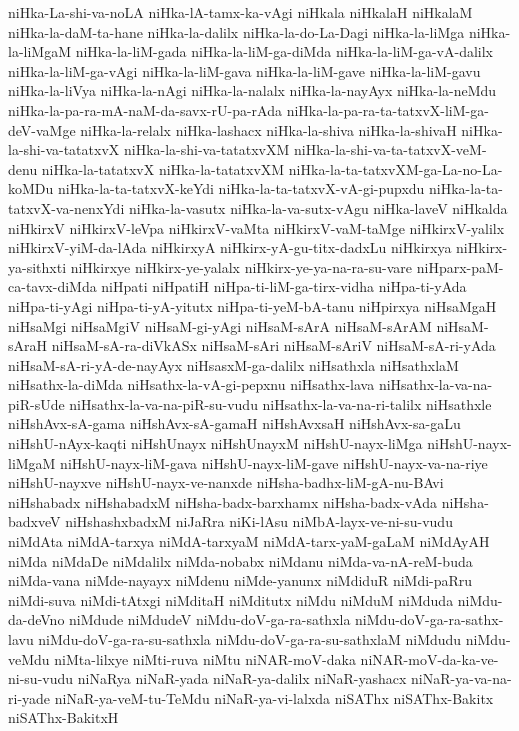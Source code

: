 {niHka-La-shi-va-noLA
niHka-lA-tamx-ka-vAgi
niHkala
niHkalaH
niHkalaM
niHka-la-daM-ta-hane
niHka-la-dalilx
niHka-la-do-La-Dagi
niHka-la-liMga
niHka-la-liMgaM
niHka-la-liM-gada
niHka-la-liM-ga-diMda
niHka-la-liM-ga-vA-dalilx
niHka-la-liM-ga-vAgi
niHka-la-liM-gava
niHka-la-liM-gave
niHka-la-liM-gavu
niHka-la-liVya
niHka-la-nAgi
niHka-la-nalalx
niHka-la-nayAyx
niHka-la-neMdu
niHka-la-pa-ra-mA-naM-da-savx-rU-pa-rAda
niHka-la-pa-ra-ta-tatxvX-liM-ga-deV-vaMge
niHka-la-relalx
niHka-lashacx
niHka-la-shiva
niHka-la-shivaH
niHka-la-shi-va-tatatxvX
niHka-la-shi-va-tatatxvXM
niHka-la-shi-va-ta-tatxvX-veM-denu
niHka-la-tatatxvX
niHka-la-tatatxvXM
niHka-la-ta-tatxvXM-ga-La-no-La-koMDu
niHka-la-ta-tatxvX-keYdi
niHka-la-ta-tatxvX-vA-gi-pupxdu
niHka-la-ta-tatxvX-va-nenxYdi
niHka-la-vasutx
niHka-la-va-sutx-vAgu
niHka-laveV
niHkalda
niHkirxV
niHkirxV-leVpa
niHkirxV-vaMta
niHkirxV-vaM-taMge
niHkirxV-yalilx
niHkirxV-yiM-da-lAda
niHkirxyA
niHkirx-yA-gu-titx-dadxLu
niHkirxya
niHkirx-ya-sithxti
niHkirxye
niHkirx-ye-yalalx
niHkirx-ye-ya-na-ra-su-vare
niHparx-paM-ca-tavx-diMda
niHpati
niHpatiH
niHpa-ti-liM-ga-tirx-vidha
niHpa-ti-yAda
niHpa-ti-yAgi
niHpa-ti-yA-yitutx
niHpa-ti-yeM-bA-tanu
niHpirxya
niHsaMgaH
niHsaMgi
niHsaMgiV
niHsaM-gi-yAgi
niHsaM-sArA
niHsaM-sArAM
niHsaM-sAraH
niHsaM-sA-ra-diVkASx
niHsaM-sAri
niHsaM-sAriV
niHsaM-sA-ri-yAda
niHsaM-sA-ri-yA-de-nayAyx
niHsasxM-ga-dalilx
niHsathxla
niHsathxlaM
niHsathx-la-diMda
niHsathx-la-vA-gi-pepxnu
niHsathx-lava
niHsathx-la-va-na-piR-sUde
niHsathx-la-va-na-piR-su-vudu
niHsathx-la-va-na-ri-talilx
niHsathxle
niHshAvx-sA-gama
niHshAvx-sA-gamaH
niHshAvxsaH
niHshAvx-sa-gaLu
niHshU-nAyx-kaqti
niHshUnayx
niHshUnayxM
niHshU-nayx-liMga
niHshU-nayx-liMgaM
niHshU-nayx-liM-gava
niHshU-nayx-liM-gave
niHshU-nayx-va-na-riye
niHshU-nayxve
niHshU-nayx-ve-nanxde
niHsha-badhx-liM-gA-nu-BAvi
niHshabadx
niHshabadxM
niHsha-badx-barxhamx
niHsha-badx-vAda
niHsha-badxveV
niHshashxbadxM
niJaRra
niKi-lAsu
niMbA-layx-ve-ni-su-vudu
niMdAta
niMdA-tarxya
niMdA-tarxyaM
niMdA-tarx-yaM-gaLaM
niMdAyAH
niMda
niMdaDe
niMdalilx
niMda-nobabx
niMdanu
niMda-va-nA-reM-buda
niMda-vana
niMde-nayayx
niMdenu
niMde-yanunx
niMdiduR
niMdi-paRru
niMdi-suva
niMdi-tAtxgi
niMditaH
niMditutx
niMdu
niMduM
niMduda
niMdu-da-deVno
niMdude
niMdudeV
niMdu-doV-ga-ra-sathxla
niMdu-doV-ga-ra-sathx-lavu
niMdu-doV-ga-ra-su-sathxla
niMdu-doV-ga-ra-su-sathxlaM
niMdudu
niMdu-veMdu
niMta-lilxye
niMti-ruva
niMtu
niNAR-moV-daka
niNAR-moV-da-ka-ve-ni-su-vudu
niNaRya
niNaR-yada
niNaR-ya-dalilx
niNaR-yashacx
niNaR-ya-va-na-ri-yade
niNaR-ya-veM-tu-TeMdu
niNaR-ya-vi-lalxda
niSAThx
niSAThx-Bakitx
niSAThx-BakitxH
}
